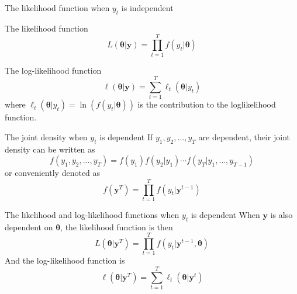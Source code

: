 \documentclass[presentation,10pt]{beamer}
\begin{document}
\begin{frame}[label={sec:orgc11df8b}]{The likelihood function when \(y_t\) is independent}
\begin{block}{The likelihood function}
\begin{equation}
\label{eq:general-likelihood}
L(\boldsymbol{\theta} | \mathbf{y}) = \prod_{t=1}^T f(y_t | \boldsymbol{\theta})
\end{equation}
\end{block}

\begin{block}{The log-likelihood function}
\begin{equation}
\label{eq:general-logL}
\ell(\boldsymbol{\theta} | \mathbf{y}) = \sum_{t=1}^T \ell_t(\boldsymbol{\theta} | y_t)
\end{equation}
where \(\ell_t(\boldsymbol{\theta} | y_t) = \ln\left(f(y_t |
\boldsymbol{\theta})\right)\) is the \alert{contribution} to the
loglikelihood function.
\end{block}
\end{frame}

\begin{frame}[label={sec:org4217cfa}]{The joint density when \(y_t\) is dependent}
If \(y_1, y_2, \ldots, y_T\) are dependent, their joint density can be
written as
\[ f(y_1, y_2, \ldots, y_T) = f(y_1) f(y_2 | y_1) \cdots f(y_T | y_1,
\ldots, y_{T-1}) \]
or conveniently denoted as
\[f(\mathbf{y}^T) = \prod_{t=1}^T f(y_t | \mathbf{y}^{t-1}) \]
\end{frame}

\begin{frame}[label={sec:org0e73dd3}]{The likelihood and log-likelihood functions when \(y_t\) is dependent}
When \(\mathbf{y}\) is also dependent on \(\boldsymbol{\theta}\), the
likelihood function is then
\begin{equation}
\label{eq:depend-likelihood}
L(\boldsymbol{\theta} | \mathbf{y}^T) = \prod_{t=1}^T f(y_t | \mathbf{y}^{t-1}, \boldsymbol{\theta})
\end{equation}
And the log-likelihood function is
\begin{equation}
\label{eq:depend-logL}
\ell(\boldsymbol{\theta} | \mathbf{y}^T) = \sum_{t=1}^T \ell_t(\boldsymbol{\theta} | \mathbf{y}^{t})
\end{equation}
\end{frame}
\end{document}
